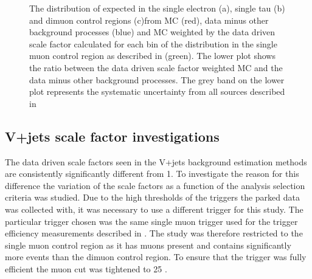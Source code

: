 \begin{figure}
  \caption{The distribution of \METnoMU expected in the single electron (a), single tau (b) and dimuon control regions (c)from \ac{MC} (red), data minus other background processes (blue) and \ac{MC} weighted by the data driven scale factor calculated for each bin of the \METnoMU distribution in the single muon control region as described in  (green). The lower plot shows the ratio between the data driven scale factor weighted \ac{MC} and the data minus other background processes. The grey band on the lower plot represents the systematic uncertainty from all sources described in }
  \label{fig:parkedclosure}
\end{figure}

\subsection{V+jets scale factor investigations}
\label{sec:parkedscalefactors}
The data driven scale factors seen in the V+jets background estimation methods are consistently significantly different from 1. To investigate the reason for this difference the variation of the scale factors as a function of the analysis selection criteria was studied. Due to the high thresholds of the triggers the parked data was collected with, it was necessary to use a different trigger for this study. The particular trigger chosen was the same single muon trigger used for the trigger efficiency measurements described in . The study was therefore restricted to the single muon control region as it has muons present and contains significantly more events than the dimuon control region. To ensure that the trigger was fully efficient the muon \pt cut was tightened to 25 \GeV.

